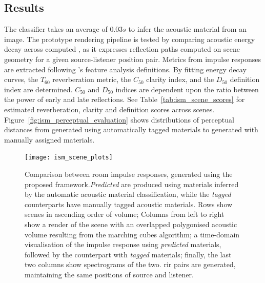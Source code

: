 \subsection{Results}
The classifier takes an average of $0.03s$ to infer the acoustic material from an image. The prototype rendering pipeline is tested by comparing acoustic energy decay across computed , as it expresses reflection paths computed on scene geometry for a given source-listener position pair. Metrics from impulse responses are extracted following \cite{lima_RIR_Parameters}'s feature analysis definitions. By fitting energy decay curves, the $T_{60}$ reverberation metric, the $C_{50}$ clarity index, and the $D_{50}$ definition index are determined. $C_{50}$ and $D_{50}$ indices are dependent upon the ratio between the power of early and late reflections. See Table~\ref{tab:ism_scene_scores} for estimated reverberation, clarity and definition scores across scenes. Figure~\ref{fig:ism_perceptual_evaluation} shows distributions of perceptual distances from  generated using automatically tagged materials to  generated with manually assigned materials.\par


\begin{figure}[htbp]
    \centering
    \texttt{[image: ism\_scene\_plots]}
    \caption[Image-Source Model-based acoustic rendering --- Objective test results]{Comparison between room impulse responses, generated using the proposed framework.\emph{Predicted}  are produced using materials inferred by the automatic acoustic material classification, while the \emph{tagged} counterparts have manually tagged acoustic materials. Rows show scenes in ascending order of volume; Columns from left to right show a render of the scene with an overlapped polygonised acoustic volume resulting from the marching cubes algorithm; a time-domain visualisation of the impulse response using \emph{predicted} materials, followed by the counterpart with \emph{tagged} materials; finally, the last two columns show spectrograms of the two. \acrshort{rir} pairs are generated, maintaining the same positions of source and listener.}
    \label{fig:ism_scene_plots}
\end{figure}

